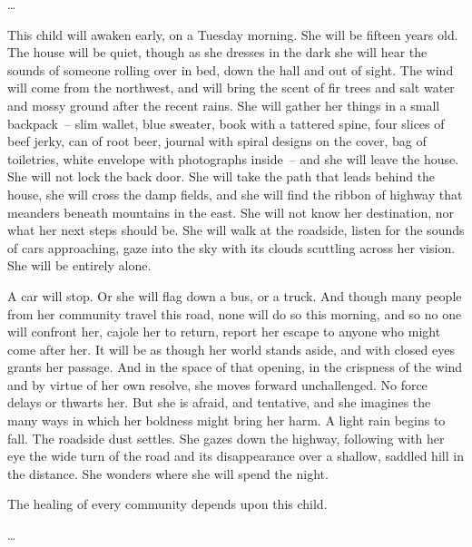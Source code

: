 \documentclass[10pt,DIV09,letterpaper,oneside,headsepline]{scrreprt}
\begin{document}
\ldots

This child will awaken early, on a Tuesday morning. She will be fifteen years old. The house will be quiet, though as she dresses in the dark she will hear the sounds of someone rolling over in bed, down the hall and out of sight. The wind will come from the northwest, and will bring the scent of fir trees and salt water and mossy ground after the recent rains. She will gather her things in a small backpack~-- slim wallet, blue sweater, book with a tattered spine, four slices of beef jerky, can of root beer, journal with spiral designs on the cover, bag of toiletries, white envelope with photographs inside~-- and she will leave the house. She will not lock the back door. She will take the path that leads behind the house, she will cross the damp fields, and she will find the ribbon of highway that meanders beneath mountains in the east. She will not know her destination, nor what her next steps should be. She will walk at the roadside, listen for the sounds of cars approaching, gaze into the sky with its clouds scuttling across her vision. She will be entirely alone.

A car will stop. Or she will flag down a bus, or a truck. And though many people from her community travel this road, none will do so this morning, and so no one will confront her, cajole her to return, report her escape to anyone who might come after her. It will be as though her world stands aside, and with closed eyes grants her passage. And in the space of that opening, in the crispness of the wind and by virtue of her own resolve, she moves forward unchallenged. No force delays or thwarts her. But she is afraid, and tentative, and she imagines the many ways in which her boldness might bring her harm. A light rain begins to fall. The roadside dust settles. She gazes down the highway, following with her eye the wide turn of the road and its disappearance over a shallow, saddled hill in the distance. She wonders where she will spend the night.

The healing of every community depends upon this child.

\ldots
\end{document}
